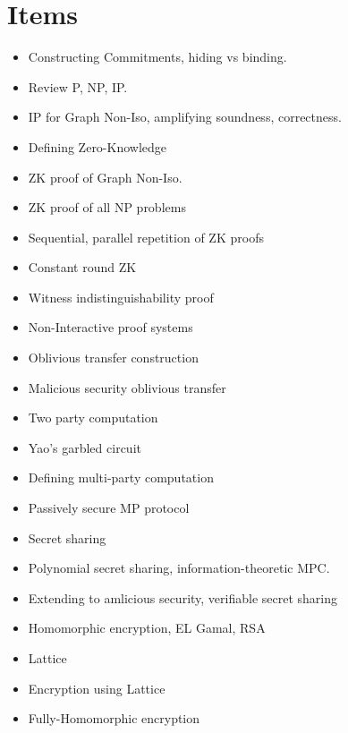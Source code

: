 \documentclass{article}
\begin{document}
	
	\section{Items}
	\begin{itemize}
	\item Constructing Commitments, hiding vs binding.
	\item Review P, NP, IP.
	\item IP for Graph Non-Iso, amplifying soundness, correctness. 
	\item Defining Zero-Knowledge
	\item ZK proof of Graph Non-Iso.
	\item ZK proof of all NP problems
	\item Sequential, parallel repetition of ZK proofs
	\item Constant round ZK 
	\item Witness indistinguishability proof
	\item Non-Interactive proof systems
	\item Oblivious transfer construction
	\item Malicious security oblivious transfer
	\item Two party computation
	\item Yao's garbled circuit
	\item Defining multi-party computation
	\item Passively secure MP protocol
	\item Secret sharing
	\item Polynomial secret sharing, information-theoretic MPC.
	\item Extending to amlicious security, verifiable secret sharing
	\item Homomorphic encryption, EL Gamal, RSA
	\item Lattice
	\item Encryption using Lattice
	\item Fully-Homomorphic encryption
	\end{itemize}
	
\end{document}

